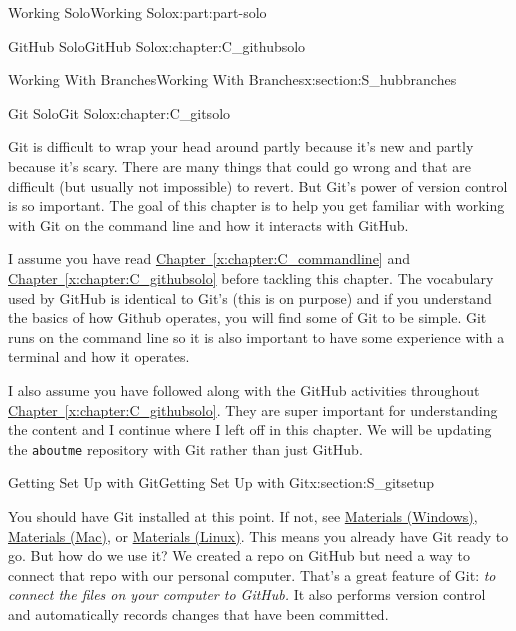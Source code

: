 \documentclass[oneside,10pt,]{book}
\newcommand{\xreffont}{\relax}
\newcommand{\mono}[1]{\texttt{#1}}
\begin{document}
\begin{partptx}{Working Solo}{}{Working Solo}{}{}{x:part:part-solo}
\begin{chapterptx}{GitHub Solo}{}{GitHub Solo}{}{}{x:chapter:C_githubsolo}
\begin{sectionptx}{Working With Branches}{}{Working With Branches}{}{}{x:section:S_hubbranches}
\begin{conclusion}{}
\end{conclusion}%
\end{sectionptx}
\end{chapterptx}
%
\typeout{************************************************}
\typeout{************************************************}
%
\begin{chapterptx}{Git Solo}{}{Git Solo}{}{}{x:chapter:C_gitsolo}
%
%
\begin{introduction}{}%
Git is difficult to wrap your head around partly because it's new and partly because it's scary. There are many things that could go wrong and that are difficult (but usually not impossible) to revert. But Git's power of version control is so important. The goal of this chapter is to help you get familiar with working with Git on the command line and how it interacts with GitHub.%
\par
I assume you have read \hyperref[x:chapter:C_commandline]{Chapter~{\xreffont\ref{x:chapter:C_commandline}}} and \hyperref[x:chapter:C_githubsolo]{Chapter~{\xreffont\ref{x:chapter:C_githubsolo}}} before tackling this chapter. The vocabulary used by GitHub is identical to Git's (this is on purpose) and if you understand the basics of how Github operates, you will find some of Git to be simple. Git runs on the command line so it is also important to have some experience with a terminal and how it operates.%
\par
I also assume you have followed along with the GitHub activities throughout \hyperref[x:chapter:C_githubsolo]{Chapter~{\xreffont\ref{x:chapter:C_githubsolo}}}. They are super important for understanding the content and I continue where I left off in this chapter. We will be updating the \mono{aboutme} repository with Git rather than just GitHub.%
\end{introduction}%
%
%
\typeout{************************************************}
\typeout{************************************************}
%
\begin{sectionptx}{Getting Set Up with Git}{}{Getting Set Up with Git}{}{}{x:section:S_gitsetup}
%
%
\begin{introduction}{}%
You should have Git installed at this point. If not, see \hyperref[x:preface:materials-windows]{Materials (Windows)}, \hyperref[x:preface:materials-mac]{Materials (Mac)}, or \hyperref[x:preface:materials-linux]{Materials (Linux)}. This means you already have Git ready to go. But how do we use it? We created a repo on GitHub but need a way to connect that repo with our personal computer. That's a great feature of Git: \emph{to connect the files on your computer to GitHub.} It also performs version control and automatically records changes that have been committed.%

\end{introduction}
\end{sectionptx}
\end{chapterptx}
\end{partptx}
\end{document}

